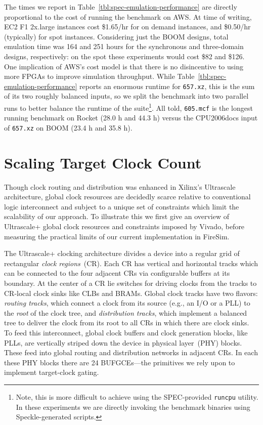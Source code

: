 The times we report in Table~\ref{tbl:spec-emulation-performance} are directly
proportional to the cost of running the benchmark on AWS. At time of writing,
EC2 F1 2x.large instances cost \$1.65/hr for on demand instances, and \$0.50/hr
(typically) for spot instances. Considering just the BOOM designs, total
emulation time was 164 and 251 hours for the synchronous and three-domain
designs, respectively: on the spot these experiments would cost \$82 and \$126. One
implication of AWS's cost model is that there is no disincentive to
using more FPGAs to improve simulation throughput. While
Table~\ref{tbl:spec-emulation-performance} reports an enormous runtime for
\texttt{657.xz}, this is the sum of its two roughly balanced inputs, so we split the
benchmark into two parallel runs to better balance the runtime of the
suite\footnote{Note, this is more difficult to achieve using the SPEC-provided
\texttt{runcpu} utility. In these experiments we are directly invoking the
benchmark binaries using Speckle-generated scripts.}. All told, \texttt{605.mcf} is the longest running benchmark on Rocket
(28.0 h and 44.3 h) versus the CPU2006docs input of \texttt{657.xz} on BOOM (23.4 h
and 35.8 h).

\section{Scaling Target Clock Count}\label{sec:clock-scalability}

Though clock routing and distribution was enhanced in Xilinx's Ultrascale
architecture, global clock resources are decidedly scarce relative to
conventional logic interconnect and subject to a unique set of constraints
which limit the scalability of our approach. To illustrate this we first give an
overview of Ultrascale+ global clock resources and constraints imposed by
Vivado, before measuring the practical limits of our current implementation in
FireSim.


The Ultrascale+ clocking architecture divides
a device into a regular grid of rectangular \emph{clock regions}~(CR). Each
CR has vertical and horizontal tracks which can be connected to the four
adjacent CRs via configurable buffers at its boundary. At the center of a CR lie switches for
driving clocks from the tracks to CR-local clock sinks like CLBs and BRAMs. Global clock tracks have two flavors: \emph{routing tracks}, which connect
a clock from its source (e.g., an I/O or a PLL) to the \emph{root} of the clock
tree, and \emph{distribution tracks}, which implement a balanced tree to
deliver the clock from its root to all CRs in which there are clock sinks.
To feed this interconnect, global clock buffers and clock generation blocks, like PLLs, are vertically
striped down the device in physical layer~(PHY) blocks. These feed into
global routing and distribution networks in adjacent CRs. In each these PHY blocks there
are 24 BUFGCEs---the primitives we rely upon to implement target-clock gating.

